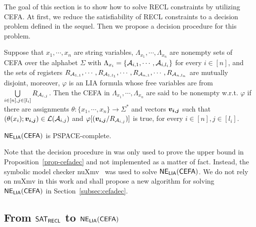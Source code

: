 
The goal of this section is to show how to solve RECL constraints by utilizing CEFA. 
At first, we reduce the satisfiability of RECL constraints to a decision problem defined in the sequel. Then we propose a decision procedure for this problem. 

\begin{definition}
Suppose that $x_1, \cdots, x_n$ are string variables, $\Lambda_{x_1}, \cdots, \Lambda_{x_n}$ are nonempty sets of CEFA over the alphabet $\Sigma$ with $\Lambda_{x_i} = \{\mathcal{A}_{i, 1}, \cdots, \mathcal{A}_{i, l_i}\}$ for every $i \in [n]$, and the sets of registers $R_{\mathcal{A}_{1, 1}}, \cdots, R_{\mathcal{A}_{1, l_1}}, \cdots, R_{\mathcal{A}_{n, 1}}, \cdots, R_{\mathcal{A}_{n, l_n}}$ are mutually disjoint, moreover, $\varphi$ is an LIA formula whose free variables are from $ \bigcup \limits_{i \in [n], j \in [l_i]} R_{\mathcal{A}_{i, j}}$. Then  the CEFA in $\Lambda_{x_1}, \cdots, \Lambda_{x_n}$ are said to be nonempty w.r.t. $\varphi$ if there are assignments $\theta: \{x_1, \cdots, x_n\} \rightarrow \Sigma^*$ and vectors $\myvec{v_{i,j}}$
such that $(\theta(x_i); \myvec{v_{i,j}}) \in \Lang(\aut_{i, j})$ and  $\varphi[(\myvec{v_{i,j}}/R_{\aut_{i,j}})]$ is true, for every $i \in [n], j \in [l_i]$.
\end{definition}
\begin{proposition}\label{prop-cefadec}
${\sf NE_{LIA}(CEFA)}$ is PSPACE-complete. 
\end{proposition}
Note that the decision procedure in \cite{atva2020} was only used to prove the upper bound in Proposition~\ref{prop-cefadec} and not implemented as a matter of fact. Instead, the symbolic model checker nuXmv~\cite{nuxmv} was used to solve ${\sf NE_{LIA}(CEFA)}$. We do not rely on nuXmv in this work and shall propose a new algorithm for solving ${\sf NE_{LIA}(CEFA)}$ in Section~\ref{subsec:cefadec}. 

\subsection{From ${\sf SAT_{RECL}}$ to ${\sf NE_{LIA}(CEFA)}$} \label{subsec:regex2cefa}

